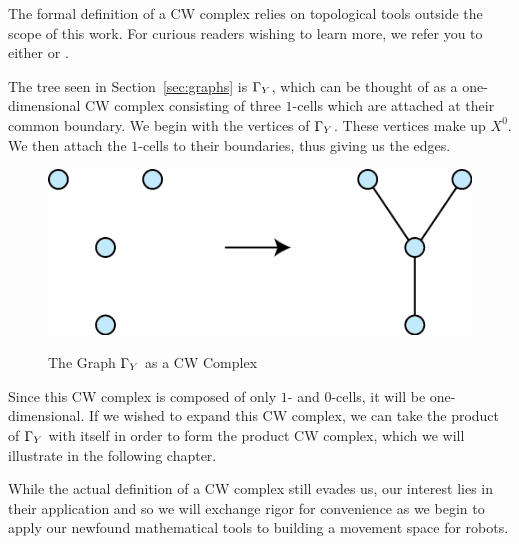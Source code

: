 The formal definition of a CW complex relies on topological tools outside the scope of this work. For curious readers wishing to learn more, we refer you to either \cite{at} or \cite{cw}.

The tree seen in Section~\ref{sec:graphs} is $\Gamma_Y$, which can be thought of as a one-dimensional CW complex consisting of three $1$-cells which are attached at their common boundary. We begin with the vertices of $\Gamma_Y$. These vertices make up $X^0$. We then attach the $1$-cells to their boundaries, thus giving us the edges.

\begin{figure}[h]
\centering
\caption{The Graph $\Gamma_Y$ as a CW Complex}
\includegraphics[scale=.75]{CW_Y}
\label{fig:cw_y}
\end{figure}

Since this CW complex is composed of only $1$- and $0$-cells, it will be one-dimensional. If we wished to expand this CW complex, we can take the product of $\Gamma_Y$ with itself in order to form the product CW complex, which we will illustrate in the following chapter.

While the actual definition of a CW complex still evades us, our interest lies in their application and so we will exchange rigor for convenience as we begin to apply our newfound mathematical tools to building a movement space for robots.